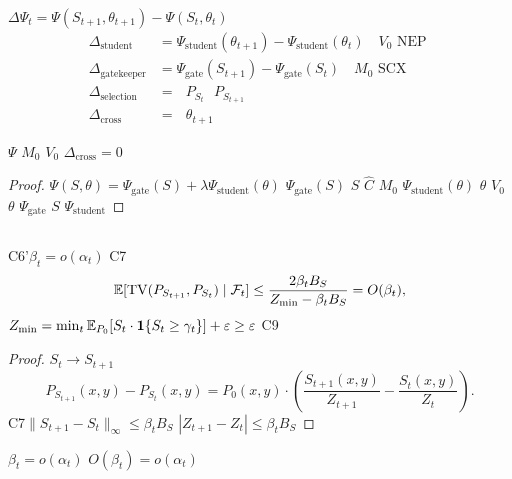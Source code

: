  $\Delta\Psi_t = \Psi(S_{t+1}, \theta_{t+1}) - \Psi(S_t, \theta_t)$ 
\begin{align}
    \Delta_{\text{student}} &= \Psi_{\text{student}}(\theta_{t+1}) - \Psi_{\text{student}}(\theta_t) \quad \text{$V_0$  NEP } \\
    \Delta_{\text{gatekeeper}} &= \Psi_{\text{gate}}(S_{t+1}) - \Psi_{\text{gate}}(S_t) \quad \text{$M_0$  SCX } \\
    \Delta_{\text{selection}} &= \text{ $P_{S_t}$  $P_{S_{t+1}}$ } \\
    \Delta_{\text{cross}} &= \text{ $\theta_{t+1}$}
\end{align}

\begin{lemma}[]\label{lem:cross-zero}
 $\Psi$  $M_0$  $V_0$ $\Delta_{\text{cross}} = 0$
\end{lemma}

\begin{proof}
$\Psi(S, \theta) = \Psi_{\text{gate}}(S) + \lambda \Psi_{\text{student}}(\theta)$ $\Psi_{\text{gate}}(S)$  $S$  $\hat{C}$  $M_0$ $\Psi_{\text{student}}(\theta)$  $\theta$  $V_0$ $\theta$  $\Psi_{\text{gate}}$ $S$  $\Psi_{\text{student}}$\textbf{}
\end{proof}

\subsection{}

\begin{lemma}[]\label{lem:tv-bound}
 C6'$\beta_t = o(\alpha_t)$ C7
\begin{equation}
    \mathbb{E}[\operatorname{TV}(P_{S_{t+1}}, P_{S_t}) \mid \mathcal{F}_t] \leq \frac{2\beta_t B_S}{Z_{\min} - \beta_t B_S} = O(\beta_t),
\end{equation}
 $Z_{\min} = \min_t \mathbb{E}_{P_0}[S_t \cdot \mathbf{1}\{S_t \geq \gamma_t\}] + \varepsilon \geq \varepsilon$  C9 
\end{lemma}

\begin{proof}
 $S_t \to S_{t+1}$
\begin{equation}
    P_{S_{t+1}}(x,y) - P_{S_t}(x,y) = P_0(x,y) \cdot \left(\frac{S_{t+1}(x,y)}{Z_{t+1}} - \frac{S_t(x,y)}{Z_t}\right).
\end{equation}
 C7$\|S_{t+1} - S_t\|_\infty \leq \beta_t B_S$ $|Z_{t+1} - Z_t| \leq \beta_t B_S$
\end{proof}

 $\beta_t = o(\alpha_t)$ $O(\beta_t) = o(\alpha_t)$

